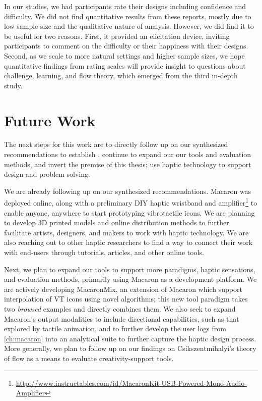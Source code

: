 In our studies, we had participants rate their designs including confidence and difficulty.
We did not find quantitative results from these reports, mostly due to low sample size and the qualitative nature of analysis.
However, we did find it to be useful for two reasons.
First, it provided an elicitation device, inviting participants to comment on the difficulty or their happiness with their designs.
Second, as we scale to more natural settings and higher sample sizes, we hope quantitative findings from rating scales will provide insight to questions about challenge, learning, and flow theory, which emerged from the third in-depth study.




%
%
\section{Future Work}
The next steps for this work are to directly follow up on our synthesized recommendations to establish \haxd, continue to expand our our tools and evaluation methods, and invert the premise of this thesis: use haptic technology to support design and problem solving.

We are already following up on our synthesized recommendations.
Macaron was deployed online, along with a preliminary DIY haptic wristband and amplifier\footnote{\url{http://www.instructables.com/id/MacaronKit-USB-Powered-Mono-Audio-Amplifier}} to enable anyone, anywhere to start prototyping vibrotactile icons.
We are planning to develop 3D printed models and online distribution methods to further facilitate artists, designers, and makers to work with haptic technology.
We are also reaching out to other haptic researchers to find a way to connect their work with end-users through tutorials, articles, and other online tools.

Next, we plan to expand our tools to support more paradigms, haptic sensations, and evaluation methods, primarily using Macaron as a development platform.
We are actively developing MacaronMix, an extension of Macaron which support interpolation of VT icons using novel algorithms; this new tool paradigm takes two \emph{browsed} examples and directly combines them.
We also seek to expand Macaron's output modalities to include directional capabilities, such as that explored by tactile animation, and to further develop the user logs from \autoref{ch:macaron} into an analytical suite to further capture the haptic design process.
More generally, we plan to follow up on our findings on Csikszentmihalyi's theory of flow \cite{Csikszentmihalyi1996} as a means to evaluate creativity-support tools.

